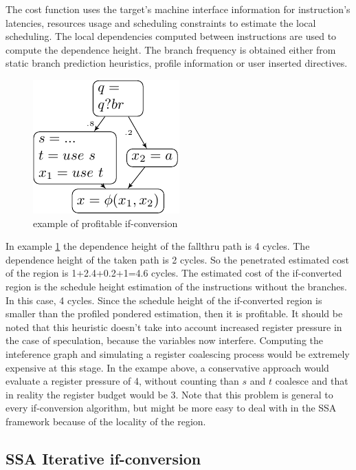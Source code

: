 The cost function uses the target's machine interface information for instruction's latencies, resources usage and scheduling constraints to estimate the local scheduling. The local dependencies computed between instructions are used to compute the dependence height. The branch frequency is obtained either from static branch prediction heuristics, profile information or user inserted directives.
\begin{figure}
    \includegraphics[scale=0.8]{ssa_freq}
\caption{example of profitable if-conversion}
\label{fig:ssa_freq}
\end{figure}

In example \ref{fig:ssa_freq} the dependence height of the fallthru path is 4 cycles. The dependence height of the taken path is 2 cycles. So the penetrated estimated cost of the region is 1+2.4+0.2+1=4.6 cycles. The estimated cost of the if-converted region is the schedule height estimation of the instructions without the branches. In this case, 4 cycles. Since the schedule height of the if-converted region is smaller than the profiled pondered estimation, then it is profitable.
It should be noted that this heuristic doesn't take into account increased register pressure in the case of speculation, because the variables now interfere. Computing the inteference graph and simulating a register coalescing process would be extremely expensive at this stage. In the exampe above, a conservative approach would evaluate a register pressure of 4, without counting than $s$ and $t$ coalesce and that in reality the register budget would be 3. Note that this problem is general to every if-conversion algorithm, but might be more easy to deal with in the SSA framework because of the locality of the region.

\subsection{SSA Iterative if-conversion}

